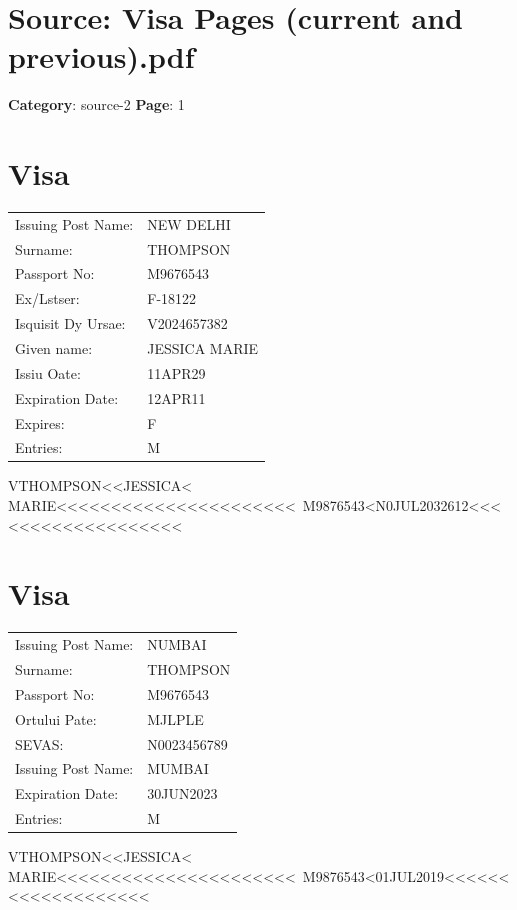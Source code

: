 \section*{Source: Visa Pages (current and previous).pdf}
\textbf{Category}: source-2
\textbf{Page}: 1

\section*{Visa}
\begin{tabular}{ll}
Issuing Post Name: & NEW DELHI \\
Surname: & THOMPSON \\
Passport No: & M9676543 \\
Ex/Lstser: & F-18122 \\
Isquisit Dy Ursae: & V2024657382 \\
Given name: & JESSICA MARIE \\
Issiu Oate: & 11APR29 \\
Expiration Date: & 12APR11 \\
Expires: & F \\
Entries: & M \\
\end{tabular}

VTHOMPSON<<JESSICA< MARIE<<<<<<<<<<<<<<<<<<<<<<\
M9876543<N0JUL2032612<<<<<<<<<<<<<<<<<<<

\section*{Visa}
\begin{tabular}{ll}
Issuing Post Name: & NUMBAI \\
Surname: & THOMPSON \\
Passport No: & M9676543 \\
Ortului Pate: & MJLPLE \\
SEVAS: & N0023456789 \\
Issuing Post Name: & MUMBAI \\
Expiration Date: & 30JUN2023 \\
Entries: & M \\
\end{tabular}

VTHOMPSON<<JESSICA< MARIE<<<<<<<<<<<<<<<<<<<<<<\
M9876543<01JUL2019<<<<<<<<<<<<<<<<<<<